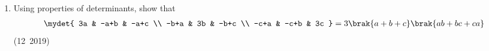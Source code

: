 \begin{enumerate}[label=\thesubsection.\arabic*, ref=\thesubsection.\theenumi]
\solution
From \eqref{eq:CBSE12-2019-arccos_to_arctan}, converting $\cos^{-1}\brak{\frac{4}{5}}$ to $\tan^{-1}$:
\begin{align}
	\cos^{-1}\frac{4}{5} = \tan^{-1}\left(\frac{\sqrt{1 - \brak{4/5}^2}}{4/5}\right) = \tan^{-1}\left(\frac{3/5}{4/5}\right) = \tan^{-1}\frac{3}{4}
\end{align}
Using the addition formula \eqref{eq:CBSE12-2019-arctan_add} for $\tan^{-1}\frac{3}{4} + \tan^{-1}\frac{2}{3}$ (since $uv = \frac{3}{4}\cdot\frac{2}{3} = \frac{1}{2} < 1$):
\begin{align}
	\tan^{-1}\frac{3}{4} + \tan^{-1}\frac{2}{3} &= \tan^{-1}\left(\frac{\frac{3}{4} + \frac{2}{3}}{1 - \frac{3}{4} \cdot \frac{2}{3}}\right) \\
	&= \tan^{-1}\left(\frac{\frac{17}{12}}{1 - \frac{6}{12}}\right) = \tan^{-1}\left(\frac{17/12}{6/12}\right) = \tan^{-1}\frac{17}{6}
\end{align}
Let $\theta = \tan^{-1}\frac{17}{6}$. From \eqref{eq:CBSE12-2019-sin_arctan}:
\begin{align}
	\sin\brak{\tan^{-1}\frac{17}{6}} = \frac{17}{\sqrt{17^2 + 6^2}} = \frac{17}{\sqrt{289 + 36}} = \frac{17}{\sqrt{325}} = \frac{17}{5\sqrt{13}} = \frac{17\sqrt{13}}{65}
\end{align}


\item Using properties of determinants, show that
\begin{align}
	\mydet{
		3a & -a+b & -a+c \\
		-b+a & 3b & -b+c \\
		-c+a & -c+b & 3c
	} = 3\brak{a+b+c}\brak{ab+bc+ca}
\end{align}
\hfill (12~2019)


\end{enumerate}
